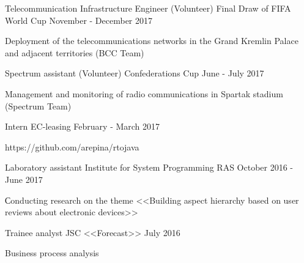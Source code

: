 \begin{cventries}
\cventry
{Telecommunication Infrastructure Engineer (Volunteer)} %
{Final Draw of FIFA World Cup} %
{} %
{November - December 2017} %
{ 
	\begin{cvitems}
		\item {Deployment of the telecommunications networks in the Grand Kremlin Palace and adjacent territories (BCC Team)}
	\end{cvitems}
}
	
\cventry
{Spectrum assistant (Volunteer)} %
{Confederations Cup} %
{} %
{June - July 2017} %
{ 
	\begin{cvitems}
		\item {Management and monitoring of radio communications in Spartak stadium (Spectrum Team)}
	\end{cvitems}
}

\cventry
{Intern} %
{EC-leasing} %
{} %
{February - March 2017} %
{ 
	\begin{cvitems}
		\item {https://github.com/arepina/rtojava}
	\end{cvitems}
}



\cventry
{Laboratory assistant} %
{Institute for System Programming RAS} %
{} %
{October 2016 - June 2017} %
{ 
	\begin{cvitems}
		\item {Сonducting research on the theme <<Building aspect hierarchy based on user reviews about electronic devices>>}
	\end{cvitems}
}


\cventry
{Trainee analyst } %
{JSC <<Forecast>>} %
{} %
{July 2016} %
{ 
	\begin{cvitems}
		\item {Business process analysis}
	\end{cvitems}
}


\end{cventries}